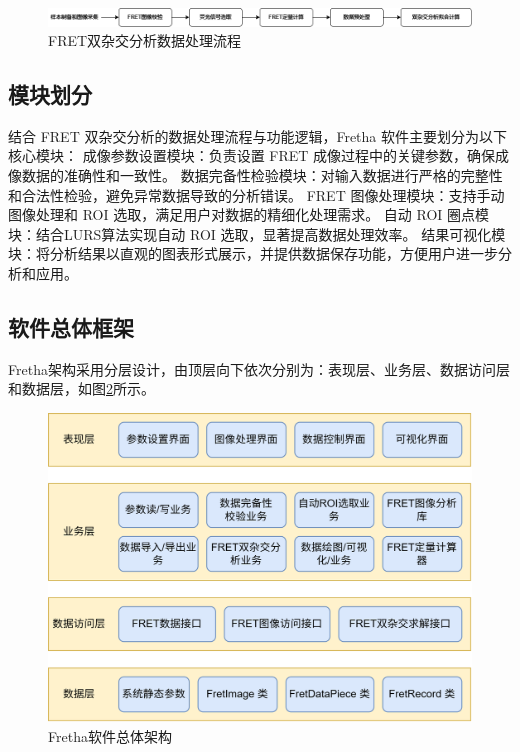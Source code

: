 \begin{figure}[hbtp]
    \centering
    \includegraphics[width=1\linewidth]{../figures/2/2_FRET双杂交分析数据处理流程.png}
    \caption{FRET双杂交分析数据处理流程}
    \label{fig:tha_data_process}
\end{figure}

\fi

\subsection{模块划分}

结合 FRET 双杂交分析的数据处理流程与功能逻辑，Fretha 软件主要划分为以下核心模块：
成像参数设置模块：负责设置 FRET 成像过程中的关键参数，确保成像数据的准确性和一致性。
数据完备性检验模块：对输入数据进行严格的完整性和合法性检验，避免异常数据导致的分析错误。
FRET 图像处理模块：支持手动图像处理和 ROI 选取，满足用户对数据的精细化处理需求。
自动 ROI 圈点模块：结合LURS算法实现自动 ROI 选取，显著提高数据处理效率。
结果可视化模块：将分析结果以直观的图表形式展示，并提供数据保存功能，方便用户进一步分析和应用。

\subsection{软件总体框架}

Fretha架构采用分层设计，由顶层向下依次分别为：表现层、业务层、数据访问层和数据层，如图\ref{fig:fretha_arch}所示。

\begin{figure}[hbtp]
    \centering
    \includegraphics[width=1\linewidth]{../figures/2/2_Fretha软件架构图.png}
    \caption{Fretha软件总体架构}
    \label{fig:fretha_arch}
\end{figure}

